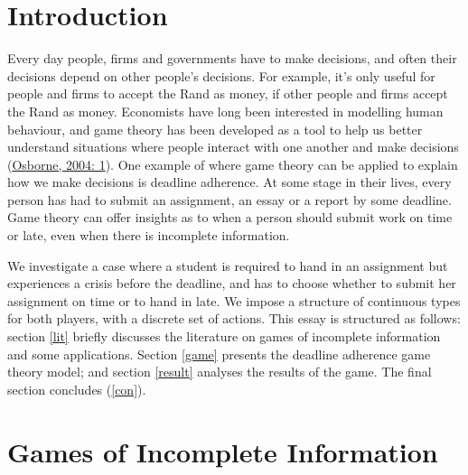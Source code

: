 \documentclass[11pt,preprint, authoryear]{elsarticle}
\numberwithin{equation}{section}
\numberwithin{figure}{section}
\numberwithin{table}{section}
\begin{document}
\renewcommand{\contentsname}{Table of Contents}
{\tableofcontents}

\pagestyle{fancy}
\chead{}
\rhead{}
\lfoot{}
\lhead{}
\cfoot{}


\headsep 35pt %




\newpage

\hypertarget{introduction}{%
\section{\texorpdfstring{Introduction
\label{intro}}{Introduction }}\label{introduction}}

Every day people, firms and governments have to make decisions, and
often their decisions depend on other people's decisions. For example,
it's only useful for people and firms to accept the Rand as money, if
other people and firms accept the Rand as money. Economists have long
been interested in modelling human behaviour, and game theory has been
developed as a tool to help us better understand situations where people
interact with one another and make decisions
(\protect\hyperlink{ref-book}{Osborne, 2004: 1}). One example of where
game theory can be applied to explain how we make decisions is deadline
adherence. At some stage in their lives, every person has had to submit
an assignment, an essay or a report by some deadline. Game theory can
offer insights as to when a person should submit work on time or late,
even when there is incomplete information.

We investigate a case where a student is required to hand in an
assignment but experiences a crisis before the deadline, and has to
choose whether to submit her assignment on time or to hand in late. We
impose a structure of continuous types for both players, with a discrete
set of actions. This essay is structured as follows: section \ref{lit}
briefly discusses the literature on games of incomplete information and
some applications. Section \ref{game} presents the deadline adherence
game theory model; and section \ref{result} analyses the results of the
game. The final section concludes (\ref{con}).

\hypertarget{games-of-incomplete-information}{%
\section{\texorpdfstring{Games of Incomplete Information
\label{lit}}{Games of Incomplete Information }}\label{games-of-incomplete-information}}
\end{document}
